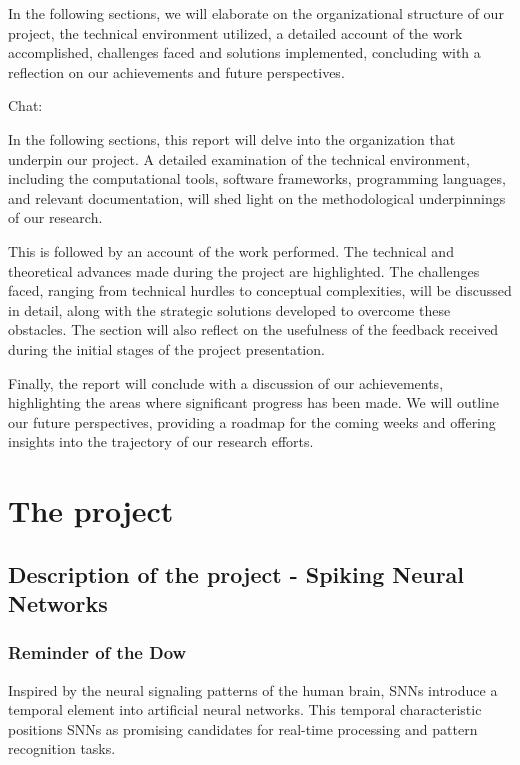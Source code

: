 \documentclass[11pt]{article}
\begin{document}
In the following sections, we will elaborate on the organizational structure of our project, the technical environment utilized, a detailed account of the work accomplished, challenges faced and solutions implemented, concluding with a reflection on our achievements and future perspectives.

Chat: 

In the following sections, this report will delve into the organization that underpin our project. A detailed examination of the technical environment, including the computational tools, software frameworks, programming languages, and relevant documentation, will shed light on the methodological underpinnings of our research.

This is followed by an account of the work performed. The technical and theoretical advances made during the project are highlighted. The challenges faced, ranging from technical hurdles to conceptual complexities, will be discussed in detail, along with the strategic solutions developed to overcome these obstacles. The section will also reflect on the usefulness of the feedback received during the initial stages of the project presentation.

Finally, the report will conclude with a discussion of our achievements, highlighting the areas where significant progress has been made. We will outline our future perspectives, providing a roadmap for the coming weeks and offering insights into the trajectory of our research efforts.





\pagebreak

\section{The project} 

\subsection{Description of the project - Spiking Neural Networks}

\subsubsection{Reminder of the Dow}

Inspired by the neural signaling patterns of the human brain, SNNs introduce a temporal element into artificial neural networks. This temporal characteristic positions SNNs as promising candidates for real-time processing and pattern recognition tasks.
\end{document}
